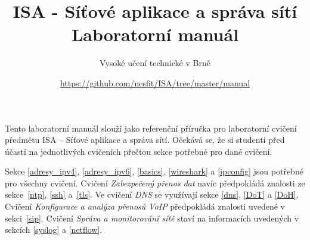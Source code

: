 \documentclass[a4paper,11pt]{article}
\title{ISA - Síťové aplikace a správa sítí\\
{\bf\large Laboratorní manuál}}
\author{Vysoké učení technické v Brně}
\date{\url{https://github.com/nesfit/ISA/tree/master/manual}}
\begin{document}
{\let\newpage\relax\maketitle}

Tento laboratorní manuál slouží jako referenční příručka pro laboratorní cvičení
předmětu ISA -- Síťové aplikace a správa sítí. Očekává se, že si studenti před
účastí na jednotlivých cvičeních přečtou sekce potřebné pro dané cvičení.

Sekce \ref{adresy_ipv4}, \ref{adresy_ipv6}, \ref{basics}, \ref{wireshark} a \ref{ipconfig} jsou
potřebné pro všechny cvičení. Cvičení \emph{Zabezpečený přenos dat} navíc
předpokládá znalosti ze sekce~\ref{ntp}, \ref{ssh} a~\ref{tls}. Ve cvičení \emph{DNS} se využívají sekce \ref{dns}, \ref{DoT} a \ref{DoH}. Cvičení
\emph{Konfigurace a analýza přenosů VoIP} předpokládá znalosti uvedené v
sekci~\ref{sip}. Cvičení \emph{Správa a monitorování sítě} staví na informacích
uvedených v sekcích \ref{syslog} a \ref{netflow}.

\setcounter{tocdepth}{1}
\tableofcontents
\newpage












\newpage




\newpage
\thispagestyle{empty}
\end{document}
